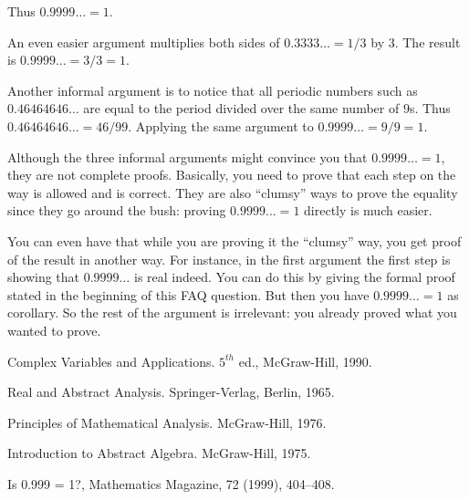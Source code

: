 Thus $0.9999\ldots = 1$.

An even easier argument multiplies both sides of $0.3333\ldots = 1/3$ by
$3$.  The result is $0.9999\ldots = 3/3 = 1$.

Another informal argument is to notice that all periodic numbers such as
$0.46464646\ldots$ are equal to the period divided over the same number
of $9$s. Thus $0.46464646\ldots=46/99$. Applying the same argument to
$0.9999\ldots=9/9=1$.

Although the three informal arguments might convince you that
$0.9999\ldots = 1$, they are not complete proofs. Basically, you need to
prove that each step on the way is allowed and is correct. They are also
``clumsy'' ways to prove the equality since they go around the bush:
proving $0.9999\ldots = 1$ directly is much easier.

You can even have that while you are proving it the ``clumsy'' way, you
get proof of the result in another way. For instance, in the first
argument the first step is showing that $0.9999\ldots$ is real
indeed. You can do this by giving the formal proof stated in the
beginning of this FAQ question. But then you have $0.9999\ldots = 1$ as
corollary. So the rest of the argument is irrelevant: you already proved
what you wanted to prove.

\Ref

 {Complex Variables and
  Applications.} {$5^{th}$ ed., McGraw-Hill, 1990.}

 {Real and Abstract Analysis.}
{Springer-Verlag, Berlin, 1965.}

 {Principles of Mathematical Analysis.} {McGraw-Hill,
  1976.}

 {Introduction to Abstract Algebra.} {McGraw-Hill,
  1975.}

 {Is 0.999 = 1?,} {Mathematics Magazine,} {72
  (1999), 404--408.}
